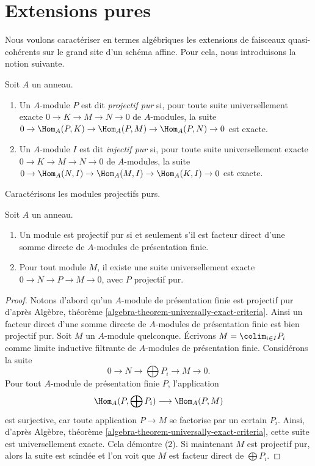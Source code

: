 \section{Extensions pures}
\label{section-pure}

\noindent
Nous voulons caractériser en termes algébriques les extensions de faisceaux
quasi-cohérents sur le grand site d'un schéma affine. Pour cela,
nous introduisons la notion suivante.

\begin{definition}
\label{definition-pure}
Soit $A$ un anneau.
\begin{enumerate}
\item Un $A$-module $P$ est dit {\it projectif pur}
si, pour toute suite universellement exacte
$0 \to K \to M \to N \to 0$ de $A$-modules, la suite
$0 \to \Hom_A(P, K) \to \Hom_A(P, M) \to \Hom_A(P, N) \to 0$
est exacte.
\item Un $A$-module $I$ est dit {\it injectif pur}
si, pour toute suite universellement exacte
$0 \to K \to M \to N \to 0$ de $A$-modules, la suite
$0 \to \Hom_A(N, I) \to \Hom_A(M, I) \to \Hom_A(K, I) \to 0$
est exacte.
\end{enumerate}
\end{definition}

\noindent
Caractérisons les modules projectifs purs.

\begin{lemma}
\label{lemma-pure-projective}
Soit $A$ un anneau.
\begin{enumerate}
\item Un module est projectif pur si et seulement s'il est
facteur direct d'une somme directe de $A$-modules de présentation finie.
\item Pour tout module $M$, il existe une suite universellement exacte
$0 \to N \to P \to M \to 0$, avec $P$ projectif pur.
\end{enumerate}
\end{lemma}

\begin{proof}
Notons d'abord qu'un $A$-module de présentation finie est projectif pur d'après
Algèbre, théorème \ref{algebra-theorem-universally-exact-criteria}.
Ainsi un facteur direct d'une somme directe de $A$-modules de présentation finie
est bien projectif pur. Soit $M$ un $A$-module quelconque.
Écrivons $M = \colim_{i \in I} P_i$ comme limite inductive filtrante de
$A$-modules de présentation finie. Considérons la suite
$$
0 \to N \to \bigoplus P_i \to M \to 0.
$$
Pour tout $A$-module de présentation finie $P$, l'application
$$
\Hom_A(P, \bigoplus P_i) \longrightarrow \Hom_A(P, M)
$$
est surjective, car toute application $P \to M$ se factorise par un certain $P_i$.
Ainsi, d'après
Algèbre, théorème \ref{algebra-theorem-universally-exact-criteria},
cette suite est universellement exacte. Cela démontre (2).
Si maintenant $M$ est projectif pur, alors la suite est scindée et
l'on voit que $M$ est facteur direct de $\bigoplus P_i$.
\end{proof}

